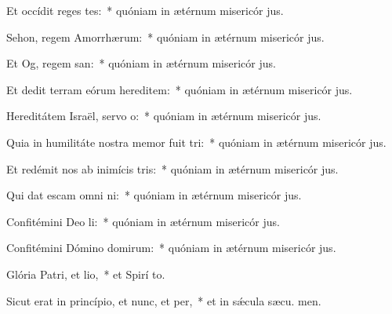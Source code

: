 \item Et occídit reges tes:~* quóniam in ætérnum misericór jus.
\item Sehon, regem Amorrhærum:~* quóniam in ætérnum misericór jus.
\item Et Og, regem san:~* quóniam in ætérnum misericór jus.
\item Et dedit terram eórum hereditem:~* quóniam in ætérnum misericór jus.
\item Hereditátem Israël, servo o:~* quóniam in ætérnum misericór jus.
\item Quia in humilitáte nostra memor fuit tri:~* quóniam in ætérnum misericór jus.
\item Et redémit nos ab inimícis tris:~* quóniam in ætérnum misericór jus.
\item Qui dat escam omni ni:~* quóniam in ætérnum misericór jus.
\item Confitémini Deo li:~* quóniam in ætérnum misericór jus.
\item Confitémini Dómino domirum:~* quóniam in ætérnum misericór jus.
\item Glória Patri, et lio,~* et Spirí to.
\item Sicut erat in princípio, et nunc, et per,~* et in sǽcula sæcu. men.
